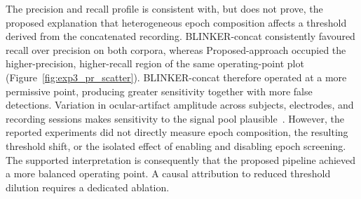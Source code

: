 The precision and recall profile is consistent with, but does not prove, the proposed explanation that heterogeneous epoch composition affects a threshold derived from the concatenated recording. BLINKER-concat consistently favoured recall over precision on both corpora, whereas Proposed-approach occupied the higher-precision, higher-recall region of the same operating-point plot (Figure~\ref{fig:exp3_pr_scatter}). BLINKER-concat therefore operated at a more permissive point, producing greater sensitivity together with more false detections. Variation in ocular-artifact amplitude across subjects, electrodes, and recording sessions makes sensitivity to the signal pool plausible~\citep{croft2000removal,guttmann2019new,klein2013reliable,kleifges2017blinker}. However, the reported experiments did not directly measure epoch composition, the resulting threshold shift, or the isolated effect of enabling and disabling epoch screening. The supported interpretation is consequently that the proposed pipeline achieved a more balanced operating point. A causal attribution to reduced threshold dilution requires a dedicated ablation.
